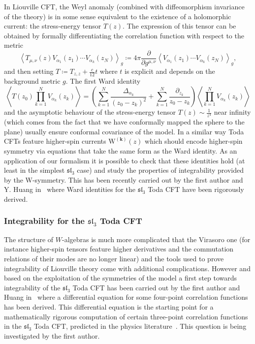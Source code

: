 \documentclass[AHL,Unicode,longabstracts,published]{cedram}
\newcommand{\frksl}{\mathfrak{sl}}
\newcommand{\rmW}{\mathrm{W}}
\begin{document}
In Liouville CFT, the Weyl anomaly (combined with diffeomorphism invariance of the theory) is in some sense equivalent to the existence of a holomorphic current: the stress-energy tensor $T(z)$. The expression of this tensor can be obtained by formally differentiating the correlation function with respect to the metric
\[
\left\langle T_{\mu,\nu}(z)V_{\alpha_1}(z_1) \cdots V_{\alpha_k}(z_N) \right\rangle_{g}\coloneqq 4\pi\frac{\partial}{\partial g^{\mu,\nu}}\left\langle V_{\alpha_1}(z_1) \cdots V_{\alpha_k}(z_N) \right\rangle_{g},
\]
and then setting $T\coloneqq T_{z,z}+\frac{c}{12}t$ where $t$ is explicit and depends on the background metric $g$. The first Ward identity
\begin{equation}
\left\langle T(z_0)\prod_{k=1}^NV_{\alpha_k}(z_k)\right\rangle = \left(\sum_{k=1}^N \frac{\Delta_{\alpha_k}}{(z_0-z_k)^2}+\sum_{k=1}^N\frac{\partial_{z_k}}{z_0-z_k}\right)\left\langle\prod_{k=1}^NV_{\alpha_k}(z_k)\right\rangle
\end{equation}
and the asymptotic behaviour of the stress-energy tensor $T(z)\sim\frac1{z^4}$ near infinity (which comes from the fact that we have conformally mapped the sphere to the plane) usually ensure conformal covariance of the model. In a similar way Toda CFTs feature higher-spin currents $\bm {\rmW^{(k)}}(z)$ which should encode higher-spin symmetry via equations that take the same form as the Ward identity. As an application of our formalism it is possible to check that these identities hold (at least in the simplest $\frksl_3$ case) and study the properties of integrability provided by the W-symmetry. This has been recently carried out by the first author and Y. Huang in~\cite{Toda_OPEWV} where Ward identities for the $\frksl_3$ Toda CFT have been rigorously derived.

\subsubsection{Integrability for the \texorpdfstring{$\frksl_3$}{sl3} Toda CFT}

The structure of $W$-algebras is much more complicated that the Virasoro one (for instance higher-spin tensors feature higher derivatives and the commutation relations of their modes are no longer linear) and the tools used to prove integrability of Liouville theory come with additional complications. However and based on the exploitation of the symmetries of the model a first step towards integrability of the $\frksl_3$ Toda CFT has been carried out by the first author and Huang in~\cite{Toda_OPEWV} where a differential equation for some four-point correlation functions has been derived. This differential equation is the starting point for a mathematically rigorous computation of certain three-point correlation functions in the $\frksl_3$ Toda CFT, predicted in the physics literature~\cite[Equation~(14)]{FaLi0}. This question is being investigated by the first author.
\end{document}
